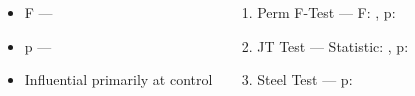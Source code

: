 \documentclass[17pt,margin=1in,innermargin=-4.5in,blockverticalspace=-0.25in]{tikzposter}
\begin{document}
\begin{columns}
{\begin{minipage}[t]{.5\linewidth}
{                \begin{minipage}[c]{.5\linewidth}
                    \begin{tikzfigure}
                        \centering
                        
                    \end{tikzfigure}
                \end{minipage}\hfill\begin{minipage}[c]{.5\linewidth}
                    \begin{itemize}
                        \item F --- 
                        \item p --- 
                        \item Influential primarily at control
                    \end{itemize}
                \end{minipage}
                \begin{enumerate}
                    \item Perm F-Test --- F: , p:
                    \item JT Test --- Statistic: , p:
                    \item Steel Test --- p:
                \end{enumerate}
            }

        \end{minipage}
    }
    

\end{columns}
\end{document}
